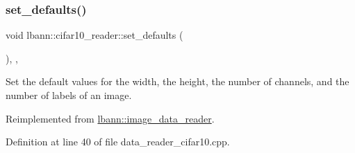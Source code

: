 \mbox{\label{classlbann_1_1cifar10__reader_a4c5389d0a6641716c96aa07e58fa4e88}} 
\subsubsection{\texorpdfstring{set\+\_\+defaults()}{set\_defaults()}}
{\footnotesize\ttfamily void lbann\+::cifar10\+\_\+reader\+::set\+\_\+defaults (\begin{DoxyParamCaption}{ }\end{DoxyParamCaption})\hspace{0.3cm}{\ttfamily [override]}, {\ttfamily [protected]}, {\ttfamily [virtual]}}



Set the default values for the width, the height, the number of channels, and the number of labels of an image. 



Reimplemented from \hyperlink{classlbann_1_1image__data__reader_a8e9dbeaa0239d56597455cc23787a21d}{lbann\+::image\+\_\+data\+\_\+reader}.



Definition at line 40 of file data\+\_\+reader\+\_\+cifar10.\+cpp.


